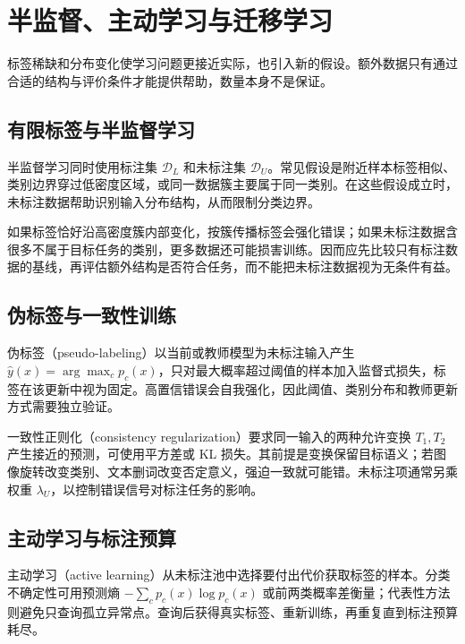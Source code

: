 \setcounter{chapter}{22} %
\chapter{半监督、主动学习与迁移学习}
\label{chap:ml-transfer}

标签稀缺和分布变化使学习问题更接近实际，也引入新的假设。额外数据只有通过合适的结构与评价条件才能提供帮助，数量本身不是保证。

\section{有限标签与半监督学习}

半监督学习同时使用标注集 $\mathcal D_L$ 和未标注集 $\mathcal D_U$。常见假设是附近样本标签相似、类别边界穿过低密度区域，或同一数据簇主要属于同一类别。在这些假设成立时，未标注数据帮助识别输入分布结构，从而限制分类边界。

如果标签恰好沿高密度簇内部变化，按簇传播标签会强化错误；如果未标注数据含很多不属于目标任务的类别，更多数据还可能损害训练。因而应先比较只有标注数据的基线，再评估额外结构是否符合任务，而不能把未标注数据视为无条件有益。

\section{伪标签与一致性训练}

伪标签（pseudo-labeling）以当前或教师模型为未标注输入产生 $\widehat y(x)=\arg\max_cp_c(x)$，只对最大概率超过阈值的样本加入监督式损失，标签在该更新中视为固定。高置信错误会自我强化，因此阈值、类别分布和教师更新方式需要独立验证。

一致性正则化（consistency regularization）要求同一输入的两种允许变换 $T_1,T_2$ 产生接近的预测，可使用平方差或 KL 损失。其前提是变换保留目标语义；若图像旋转改变类别、文本删词改变否定意义，强迫一致就可能错。未标注项通常另乘权重 $\lambda_U$，以控制错误信号对标注任务的影响。

\section{主动学习与标注预算}

主动学习（active learning）从未标注池中选择要付出代价获取标签的样本。分类不确定性可用预测熵 $-\sum_cp_c(x)\log p_c(x)$ 或前两类概率差衡量；代表性方法则避免只查询孤立异常点。查询后获得真实标签、重新训练，再重复直到标注预算耗尽。

